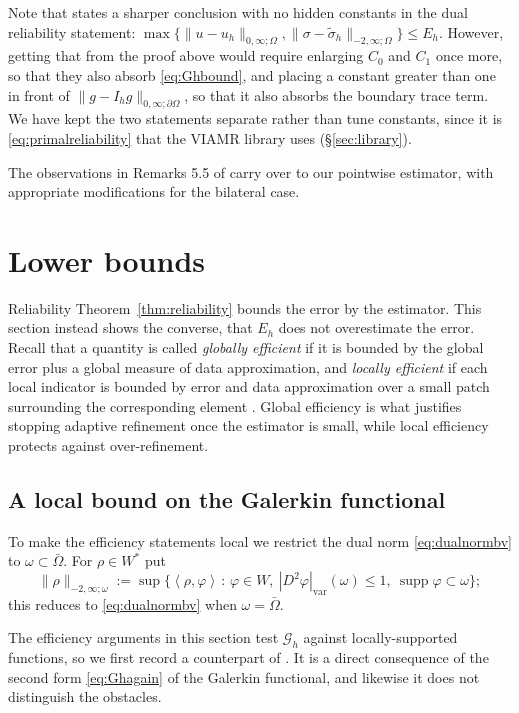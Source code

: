 \documentclass[12pt]{amsart}
\numberwithin{equation}{section}
\theoremstyle{plain}
\theoremstyle{definition}
\theoremstyle{remark}
\newcommand{\Om}{\Omega}
\newcommand{\dOm}{\partial\Omega}
\newcommand{\Ih}{I_h}
\newcommand{\Gh}{\mathcal{G}_h}
\begin{document}
Note that \cite[Theorem 5.4]{NSV03} states a sharper conclusion with no hidden constants in the dual reliability statement: $\max\{\|u-u_h\|_{0,\infty;\Om},\|\sigma-\tilde\sigma_h\|_{-2,\infty;\Om}\} \le E_h$.  However, getting that from the proof above would require enlarging $C_0$ and $C_1$ once more, so that they also absorb \eqref{eq:Ghbound}, and placing a constant greater than one in front of $\|g-\Ih g\|_{0,\infty;\dOm}$, so that it also absorbs the boundary trace term.  We have kept the two statements separate rather than tune constants, since it is \eqref{eq:primalreliability} that the VIAMR library uses (\S \ref{sec:library}).

The observations in Remarks 5.5 of \cite{NSV03} carry over to our pointwise estimator, with appropriate modifications for the bilateral case.


\section{Lower bounds} \label{sec:efficiency}

Reliability Theorem~\ref{thm:reliability} bounds the error by the estimator.  This section instead shows the converse, that $E_h$ does not overestimate the error.  Recall that a quantity is called \emph{globally efficient} if it is bounded by the global error plus a global measure of data approximation, and \emph{locally efficient} if each local indicator is bounded by error and data approximation over a small patch surrounding the corresponding element \cite[\S 6]{NSV03}.  Global efficiency is what justifies stopping adaptive refinement once the estimator is small, while local efficiency protects against over-refinement.

\subsection{A local bound on the Galerkin functional}  To make the efficiency statements local we restrict the dual norm \eqref{eq:dualnormbv} to $\omega \subset \bar\Om$.  For $\rho \in W^*$ put
\begin{equation}
\label{eq:localdual}
  \|\rho\|_{-2,\infty;\omega} := \sup\bigl\{\left<\rho,\varphi\right> \,:\, \varphi \in W,\ |D^2\varphi|_{\mathrm{var}}(\omega) \le 1,\ \operatorname{supp}\varphi \subset \omega\bigr\};
\end{equation}
this reduces to \eqref{eq:dualnormbv} when $\omega = \bar\Om$.

The efficiency arguments in this section test $\Gh$ against locally-supported functions, so we first record a counterpart of \cite[formula (3.11)]{NSV03}.  It is a direct consequence of the second form \eqref{eq:Ghagain} of the Galerkin functional, and likewise it does not distinguish the obstacles.
\end{document}
